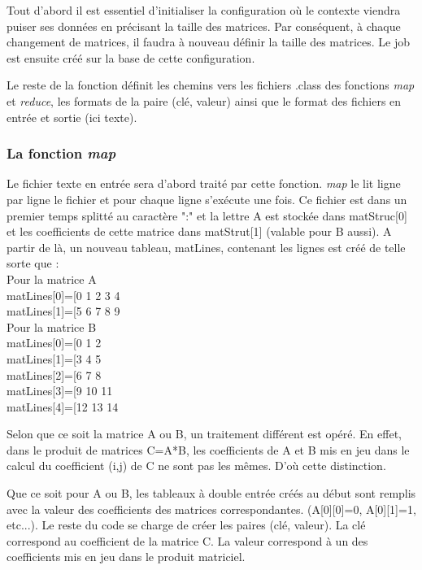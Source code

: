 \par Tout d'abord il est essentiel d'initialiser la configuration où le contexte viendra puiser ses données en précisant la taille des matrices. Par conséquent, à chaque changement de matrices, il faudra à nouveau définir la taille des matrices. Le job est ensuite créé sur la base de cette configuration.

\par Le reste de la fonction définit les chemins vers les fichiers .class des fonctions \textit{map} et \textit{reduce}, les formats de la paire (clé, valeur) ainsi que le format des fichiers en entrée et sortie (ici texte).
  
\subsubsection{La fonction \textit{map}}

\par Le fichier texte en entrée sera d'abord traité par cette fonction. \textit{map} le lit ligne par ligne le fichier et pour chaque ligne s'exécute une fois. Ce fichier est dans un premier temps splitté au caractère ":" et la lettre A est stockée dans matStruc[0] et les coefficients de cette matrice dans matStrut[1] (valable pour B aussi). A partir de là, un nouveau tableau, matLines, contenant les lignes est créé de telle sorte que \smallskip:\\
\smallskip
Pour la matrice A\\
matLines[0]=[0 1 2 3 4\\
\smallskip
matLines[1]=[5 6 7 8 9\\
Pour la matrice B\\
matLines[0]=[0 1 2\\
matLines[1]=[3 4 5\\
matLines[2]=[6 7 8\\
matLines[3]=[9 10 11\\
matLines[4]=[12 13 14\\

\par Selon que ce soit la matrice A ou B, un traitement différent est opéré. En effet, dans le produit de matrices C=A*B, les coefficients de A et B mis en jeu dans le calcul du coefficient (i,j) de C ne sont pas les mêmes. D'où cette distinction.

\par Que ce soit pour A ou B, les tableaux à double entrée créés au début sont remplis avec la valeur des coefficients des matrices correspondantes. (A[0][0]=0, A[0][1]=1, etc...). Le reste du code se charge de créer les paires (clé, valeur). La clé correspond au coefficient de la matrice C. La valeur correspond à un des coefficients mis en jeu dans le produit matriciel.

